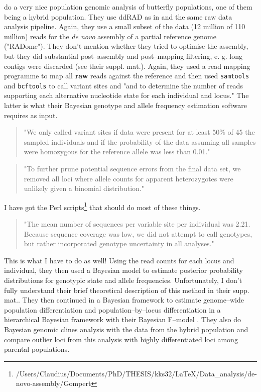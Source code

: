 \documentclass{article}\usepackage[]{graphicx}\usepackage[]{color}
\begin{document}
\cite{Gompert2012a} do a very nice population genomic analysis of butterfly populations, one of them being a hybrid population. They use \gls{ddRAD} as in \cite{Parchman2012} and the same raw data analysis pipeline. Again, they use a small subset of the data (12 million of 110 million) reads for the \emph{de novo} assembly of a partial reference genome ("RADome"). They don't mention whether they tried to optimise the assembly, but they did substantial post--assembly and post--mapping filtering, e. g. long contigs were discarded (see their suppl. mat.). Again, they used a read mapping programme to map all \textbf{raw} reads against the reference and then used \texttt{samtools} and \texttt{bcftools} to call variant sites and "and to determine the number of reads supporting each alternative nucleotide state for each individual and locus." The latter is what their Bayesian genotype and allele frequency estimation software requires as input.

\begin{quote}
"We only called variant sites if data were present for at least 50\% of 45 the sampled individuals and if the probability of the data assuming all samples were homozygous for the reference allele was less than 0.01."
\end{quote}

\begin{quote}
"To further prune potential sequence errors from the final data set, we removed all loci where allele counts for apparent heterozygotes were unlikely given a binomial distribution."
\end{quote}

I have got the Perl scripts\footnote{/Users/Claudius/Documents/PhD/THESIS/kks32/LaTeX/Data\_analysis/de-novo-assembly/Gompert
} that should do most of these things.

\begin{quote}
"The mean number of sequences per variable site per individual was 2.21. Because sequence coverage was low, we did not attempt to call genotypes, but rather incorporated genotype uncertainty in all analyses."
\end{quote}

This is what I have to do as well! Using the read counts for each locus and individual, they then used a Bayesian model to estimate posterior probability distributions for genotypic state and allele frequencies. Unfortunately, I don't fully understand their brief theoretical description of this method in their supp. mat.. They then continued in a Bayesian framework to estimate genome--wide population differentiation and population--by--locus differentiation in a hierarchical Bayesian framework with their Bayesian F--model \citep{Gompert2011a}. They also do Bayesian genomic clines analysis \citep{Gompert2011} with the data from the hybrid population and compare outlier loci from this analysis with highly differentiated loci among parental populations.
\end{document}
